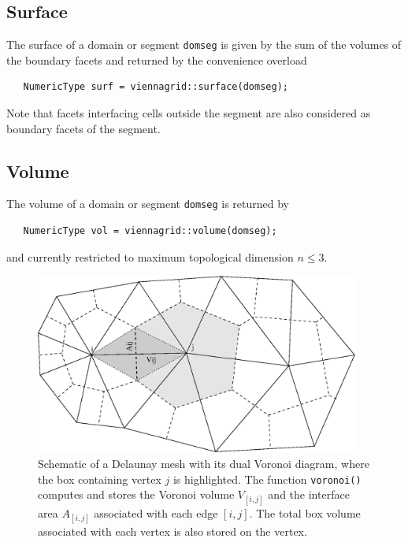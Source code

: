  \subsection{Surface}
 The surface of a domain or segment \lstinline|domseg| is given by the sum of the volumes of the boundary facets and returned by the convenience overload
  \begin{lstlisting}
   NumericType surf = viennagrid::surface(domseg);
  \end{lstlisting}
  Note that facets interfacing cells outside the segment are also considered as boundary facets of the segment.


  \subsection{Volume}
  The volume of a domain or segment \lstinline|domseg| is returned by
  \begin{lstlisting}
   NumericType vol = viennagrid::volume(domseg);
  \end{lstlisting}
  and currently restricted to maximum topological dimension $n \leq 3$.



\begin{figure}[tb]
\centering
 \includegraphics[width=0.95\textwidth]{figures/voronoi.eps}
 \caption{Schematic of a Delaunay mesh with its dual Voronoi diagram, where the box containing vertex $j$ is highlighted.
    The function \lstinline|voronoi()| computes and stores the Voronoi volume $V_{[i,j]}$ and the interface area $A_{[i,j]}$ associated with each edge $[i,j]$.
    The total box volume associated with each vertex is also stored on the vertex.}
 \label{fig:voronoi}
\end{figure}

